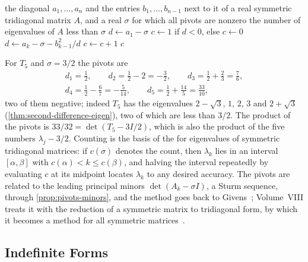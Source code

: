 \begin{algorithm}
\begin{algorithmic}[1]
\Require the diagonal $a_1,\ldots,a_n$ and the entries $b_1,\ldots,b_{n-1}$ next to it of a real symmetric tridiagonal matrix $A$, and a real $\sigma$ for which all pivots are nonzero
\Ensure the number of eigenvalues of $A$ less than $\sigma$
\State $d\gets a_1-\sigma$
\State $c\gets1$ if $d<0$, else $c\gets0$
  \State $d\gets a_k-\sigma-b_{k-1}^2/d$ 
   $c\gets c+1$ \EndIf
\EndFor
\State \Return $c$
\end{algorithmic}
\caption{Counting the eigenvalues of a symmetric tridiagonal matrix below $\sigma$ by the signs of the pivots of $A-\sigma I$ (\cref{prop:eigen-count}). It costs about $4n$ operations. Since the count is a nondecreasing function of $\sigma$, bisection on $\sigma$ locates each eigenvalue to any accuracy.}
\label{alg:eigen-count}
\end{algorithm}

For $T_5$ and $\sigma=3/2$ the pivots are
\begin{gather*}
d_1=\frac12,\qquad d_2=\frac12-2=-\frac32,\qquad d_3=\frac12+\frac23=\frac76,\\
d_4=\frac12-\frac67=-\frac5{14},\qquad d_5=\frac12+\frac{14}5=\frac{33}{10},
\end{gather*}
two of them negative; indeed $T_5$ has the eigenvalues $2-\sqrt3$, $1$, $2$, $3$ and $2+\sqrt3$ (\cref{thm:second-difference-eigen}), two of which are less than $3/2$. The product of the pivots is $33/32=\det(T_5-3I/2)$, which is also the product of the five numbers $\lambda_j-3/2$. Counting is the basis of the  for eigenvalues of symmetric tridiagonal matrices: if $c(\sigma)$ denotes the count, then $\lambda_k$ lies in an interval $[\alpha,\beta]$ with $c(\alpha)<k\le c(\beta)$, and halving the interval repeatedly by evaluating $c$ at its midpoint locates $\lambda_k$ to any desired accuracy. The pivots are related to the leading principal minors $\det(A_k-\sigma I)$, a Sturm sequence, through \cref{prop:pivots-minors}, and the method goes back to Givens~\cite{givens1954}; Volume~VIII treats it with the reduction of a symmetric matrix to tridiagonal form, by which it becomes a method for all symmetric matrices~\cite[Sect.~8.4]{golub2013}.

\subsection{Indefinite Forms}

